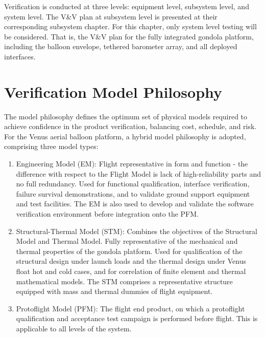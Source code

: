
Verification is conducted at three levels: equipment level, subsystem level, and system level. The V\&V plan at subsystem level is presented at their corresponding subsystem chapter. For this chapter, only system level testing will be considered. That is, the V\&V plan for the fully integrated gondola platform, including the balloon envelope, tethered barometer array, and all deployed interfaces.

\section{Verification Model Philosophy}

The model philosophy defines the optimum set of physical models required to achieve confidence in the product verification, balancing cost, schedule, and risk. For the Venus aerial balloon platform, a hybrid model philosophy is adopted, comprising three model types:

\begin{enumerate}[itemsep=1pt, parsep=1pt]
    \item Engineering Model (EM): Flight representative in form and function - the difference with respect to the Flight Model is lack of high-reliability parts and no full redundancy. Used for functional qualification, interface verification, failure survival demonstrations, and to validate ground support equipment and test facilities. The EM is also used to develop and validate the software verification environment before integration onto the PFM.
    \item Structural-Thermal Model (STM): Combines the objectives of the Structural Model and Thermal Model. Fully representative of the mechanical and thermal properties of the gondola platform. Used for qualification of the structural design under launch loads and the thermal design under Venus float hot and cold cases, and for correlation of finite element and thermal mathematical models. The STM comprises a representative structure equipped with mass and thermal dummies of flight equipment.
    \item Protoflight Model (PFM): The flight end product, on which a protoflight qualification and acceptance test campaign is performed before flight. This is applicable to all levels of the system. 
\end{enumerate}

